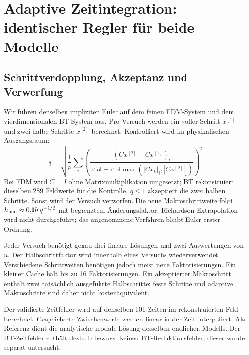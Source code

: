 \documentclass[11pt,a4paper]{article}
\begin{document}
\section{Adaptive Zeitintegration: identischer Regler für beide Modelle}
\subsection{Schrittverdopplung, Akzeptanz und Verwerfung}
Wir führen denselben impliziten Euler auf dem feinen FDM-System und dem vierdimensionalen BT-System aus. Pro Versuch werden ein voller Schritt $x^{[1]}$ und zwei halbe Schritte $x^{[2]}$ berechnet. Kontrolliert wird im physikalischen Ausgangsraum:
\begin{equation}
 q=\sqrt{\frac1p\sum_i\left(
 \frac{(C x^{[2]}-C x^{[1]})_i}
 {\mathrm{atol}+\mathrm{rtol}\max(|Cx_k|_i,|Cx^{[2]}|_i)}\right)^2}.
\end{equation}
Bei FDM wird $C=I$ ohne Matrixmultiplikation umgesetzt; BT rekonstruiert dieselben 289 Feldwerte für die Kontrolle. $q\le1$ akzeptiert die zwei halben Schritte. Sonst wird der Versuch verworfen. Die neue Makroschrittweite folgt $h_{\rm neu}\approx0{,}9h\,q^{-1/2}$ mit begrenztem Änderungsfaktor. Richardson-Extrapolation wird nicht durchgeführt; das angenommene Verfahren bleibt Euler erster Ordnung.

Jeder Versuch benötigt genau drei lineare Lösungen und zwei Auswertungen von $u$. Der Halbschrittfaktor wird innerhalb eines Versuchs wiederverwendet. Verschiedene Schrittweiten benötigen jedoch meist neue Faktorisierungen. Ein kleiner Cache hält bis zu 16 Faktorisierungen. Ein akzeptierter Makroschritt enthält zwei tatsächlich ausgeführte Halbschritte; feste Schritte und adaptive Makroschritte sind daher nicht kostenäquivalent.

Der validierte Zeitfehler wird auf denselben 101 Zeiten im rekonstruierten Feld berechnet. Gespeicherte Zwischenwerte werden linear in der Zeit interpoliert. Als Referenz dient die analytische modale Lösung desselben endlichen Modells. Der BT-Zeitfehler enthält deshalb bewusst keinen BT-Reduktionsfehler; dieser wurde separat untersucht.
\end{document}
